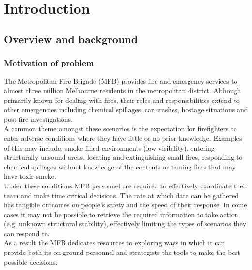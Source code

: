 \documentclass[capstone_report.tex]{subfiles}
\begin{document}
\chapter{Introduction}

\section{Overview and background}

\subsection{Motivation of problem}
The Metropolitan Fire Brigade (MFB) provides fire and emergency services to almost three million Melbourne residents in the metropolitan district.  Although primarily known for dealing with fires, their roles and responsibilities extend to other emergencies including chemical spillages, car crashes, hostage situations and post fire investigations.\\

A common theme amongst these scenarios is the expectation for firefighters to enter adverse conditions where they have little or no prior knowledge. Examples of this may include; smoke filled environments (low visibility), entering structurally unsound areas, locating and extinguishing small fires, responding to chemical spillages without knowledge of the contents or taming fires that may have toxic smoke.\\

Under these conditions MFB personnel are required to effectively coordinate their team and make time critical decisions.  The rate at which data can be gathered has tangible outcomes on people's safety and the speed of their response.  In come cases it may not be possible to retrieve the required information to take action (e.g. unknown structural stability), effectively limiting the types of scenarios they can respond to.\\

As a result the MFB dedicates resources to exploring ways in which it can provide both its on-ground personnel and strategists the tools to make the best possible decisions.\\
\end{document}
